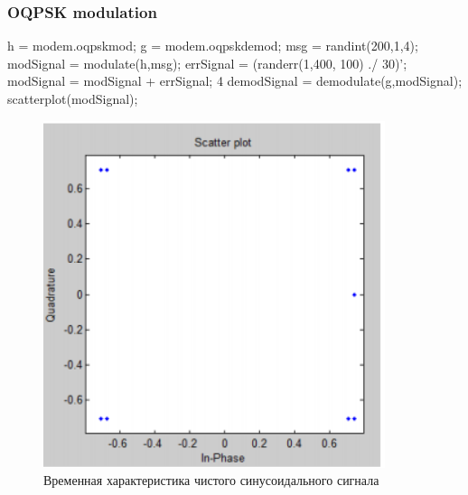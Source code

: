 \documentclass[10pt,a4paper]{article}
\begin{document}
\subsubsection{OQPSK modulation}
h = modem.oqpskmod; \newline
g = modem.oqpskdemod; \newline
msg = randint(200,1,4); \newline
modSignal = modulate(h,msg); \newline
errSignal = (randerr(1,400, 100) ./ 30)';\newline 
modSignal = modSignal + errSignal; 4 \newline
demodSignal = demodulate(g,modSignal); \newline
scatterplot(modSignal);\newline
\begin{figure}[h]
\centering
\includegraphics[width=10cm]{1_3.png} 
\caption{Временная характеристика чистого синусоидального сигнала} 
\end{figure}
\newpage
\FloatBarrier
\end{document}
